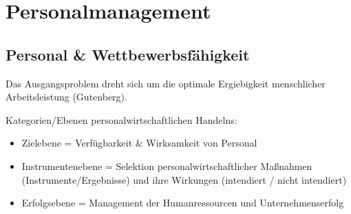 \documentclass[11pt]{article}
\date{\today}
\title{}
\begin{document}
\tableofcontents

\section{Personalmanagement}
\label{sec:orgf6885d8}
\subsection{Personal \& Wettbewerbsfähigkeit}
\label{sec:orga9c3719}
Das Ausgangsproblem dreht sich um die optimale Ergiebigkeit menschlicher Arbeitsleistung (Gutenberg).

Kategorien/Ebenen personalwirtschaftlichen Handelns:
\begin{itemize}
\item Zielebene = Verfügbarkeit \& Wirksamkeit von Personal
\item Instrumentenebene = Selektion personalwirtschaftlicher Maßnahmen (Instrumente/Ergebnisse) und ihre Wirkungen (intendiert / nicht intendiert)
\item Erfolgsebene = Management der Humanressourcen und Unternehmenserfolg
\end{itemize}
\end{document}
